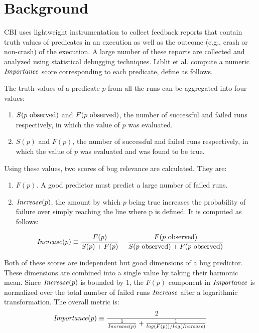 
\newcommand{\rhythmbox}{\textsc{Rhythmbox}\xspace}

\section{Background}
\label{sec-bground}
CBI uses lightweight instrumentation to collect feedback reports that contain truth values of predicates in an execution as well as the outcome (e.g., crash or non-crash) of the execution.  A large number of these reports are collected and analyzed using statistical debugging techniques.  Liblit et al. \cite{Liblit:2005:SSBI} compute a numeric $\mathit{Importance}$ score corresponding to each predicate, define as follows.

The truth values of a predicate $p$ from all the runs can be aggregated into four values:

\begin{enumerate}
\item $S(\text{$p$ observed})$ and $F(\text{$p$ observed})$, the number of successful and failed runs respectively, in which the value of $p$ was evaluated.
\item $S(p)$ and $F(p)$, the number of successful and failed runs respectively, in which the value of $p$ was evaluated and was found to be true.
\end{enumerate}

Using these values, two scores of bug relevance are calculated.  They are:
\begin{enumerate}
\item $F(p)$.  A good predictor must predict a large number of failed runs.
\item $\mathit{Increase}(p)$, the amount by which $p$ being true increases the probability of failure over simply reaching the line where p is defined.  It is computed as follows:
\end{enumerate}

\begin{equation}
\label{eqn1}
\mathit{Increase}(p) \equiv
\frac{F(p)}{S(p) + F(p)}
-
\frac{F(\text{$p$ observed})}{S(\text{$p$ observed}) + F(\text{$p$ observed})}
\end{equation}

Both of these scores are independent but good dimensions of a bug predictor.  These dimensions are combined into a single value by taking their harmonic mean.  Since $\mathit{Increase}(p)$ is bounded by 1, the $F(p)$ component in $\mathit{Importance}$ is normalized over the total number of failed runs $\mathit{Increase}$ after a logarithmic transformation.  The overall metric is:
\begin{equation}
\label{eqn2}
\Importance(p) \equiv
\frac{2}{%
  \frac{1}{\Increase(p)}
  +
  \frac{1}{log(F(p)) / log(\NumF)}}
\end{equation}

